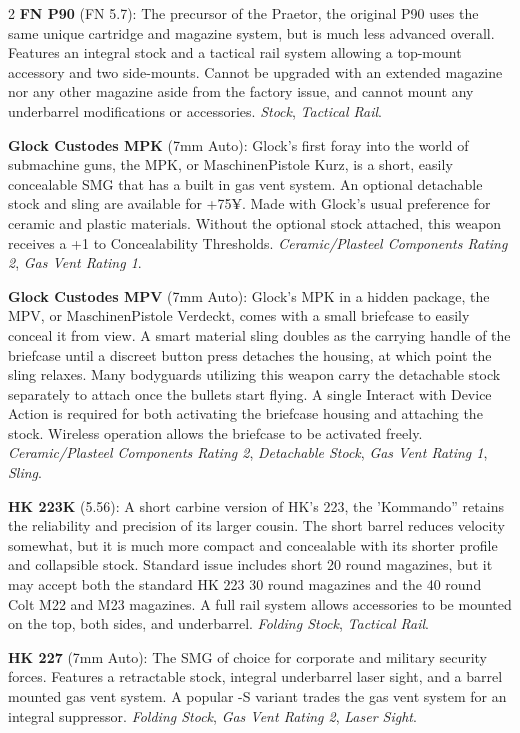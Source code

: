 \documentclass[
  oneside]{article}
\begin{document}
\begin{multicols}{2}
\textbf{FN P90} (FN 5.7): The precursor of the
Praetor, the original P90 uses the same unique
cartridge and magazine system, but is much less
advanced overall. Features an integral stock and a
tactical rail system allowing a top-mount
accessory and two side-mounts. Cannot be upgraded
with an extended magazine nor any other magazine
aside from the factory issue, and cannot mount any
underbarrel modifications or accessories.
\emph{Stock}, \emph{Tactical Rail}.

\textbf{Glock Custodes MPK} (7mm Auto): Glock's
first foray into the world of submachine guns, the
MPK, or MaschinenPistole Kurz, is a short, easily
concealable SMG that has a built in gas vent
system. An optional detachable stock and sling are
available for +75¥. Made with Glock's usual
preference for ceramic and plastic materials.
Without the optional stock attached, this weapon
receives a +1 to Concealability Thresholds.
\emph{Ceramic/Plasteel Components Rating 2},
\emph{Gas Vent Rating 1}.

\textbf{Glock Custodes MPV} (7mm Auto): Glock's
MPK in a hidden package, the MPV, or
MaschinenPistole Verdeckt, comes with a small
briefcase to easily conceal it from view. A smart
material sling doubles as the carrying handle of
the briefcase until a discreet button press
detaches the housing, at which point the sling
relaxes. Many bodyguards utilizing this weapon
carry the detachable stock separately to attach
once the bullets start flying. A single Interact
with Device Action is required for both activating
the briefcase housing and attaching the stock.
Wireless operation allows the briefcase to be
activated freely. \emph{Ceramic/Plasteel
Components Rating 2}, \emph{Detachable Stock},
\emph{Gas Vent Rating 1}, \emph{Sling}.

\textbf{HK 223K} (5.56): A short carbine version
of HK's 223, the 'Kommando'' retains the
reliability and precision of its larger cousin.
The short barrel reduces velocity somewhat, but it
is much more compact and concealable with its
shorter profile and collapsible stock. Standard
issue includes short 20 round magazines, but it
may accept both the standard HK 223 30 round
magazines and the 40 round Colt M22 and M23
magazines. A full rail system allows accessories
to be mounted on the top, both sides, and
underbarrel. \emph{Folding Stock}, \emph{Tactical
Rail}.

\textbf{HK 227} (7mm Auto): The SMG of choice for
corporate and military security forces. Features a
retractable stock, integral underbarrel laser
sight, and a barrel mounted gas vent system. A
popular -S variant trades the gas vent system for
an integral suppressor. \emph{Folding Stock},
\emph{Gas Vent Rating 2}, \emph{Laser Sight}.


\end{multicols}
\end{document}
